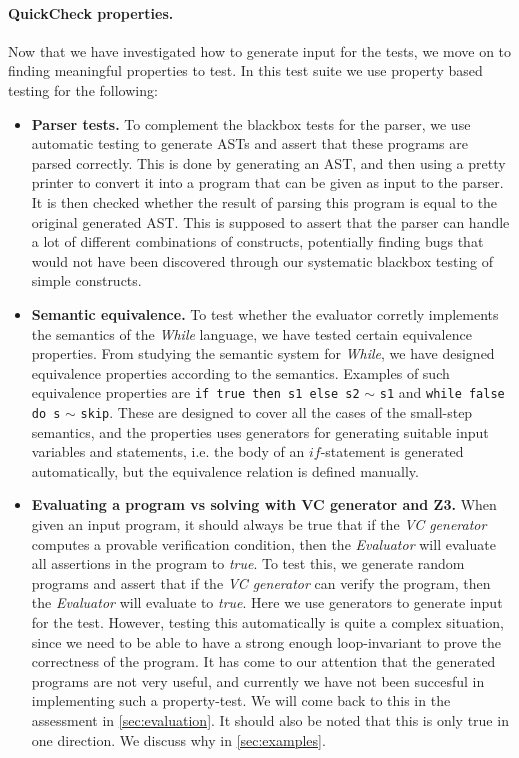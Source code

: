 \paragraph{QuickCheck properties.}
Now that we have investigated how to generate input for the tests, we move on to finding meaningful properties to test. In this test suite we use property based testing for the following:
\begin{itemize}
	\item \textbf{Parser tests.}
	To complement the blackbox tests for the parser, we use automatic testing to generate ASTs and assert that these programs are parsed correctly. This is done by generating an AST, and then using a pretty printer to convert it into a program that can be given as input to the parser. It is then checked whether the result of parsing this program is equal to the original generated AST. This is supposed to assert that the parser can handle a lot of different combinations of constructs, potentially finding bugs that would not have been discovered through our systematic blackbox testing of simple constructs.
	\item \textbf{Semantic equivalence.}
  To test whether the evaluator corretly implements the semantics of the \textit{While} language, we have tested certain equivalence properties. From studying the semantic system for \textit{While}, we have designed equivalence properties according to the semantics. 
	Examples of such equivalence properties are \texttt{if true then s1 else s2} $\sim$ \texttt{s1} and \texttt{while false do s} $\sim$ \texttt{skip}.
  These are designed to cover all the cases of the small-step semantics, and the properties uses generators for generating suitable input variables and statements, i.e. the body of an $if$-statement is generated automatically, but the equivalence relation is defined manually.
	\item \textbf{Evaluating a program vs solving with VC generator and Z3.}
	When given an input program, it should always be true that if the \textit{VC generator} computes a provable verification condition, then the \textit{Evaluator} will evaluate all assertions in the program to \textit{true}.
	To test this, we generate random programs and assert that if the \textit{VC generator} can verify the program, then the \textit{Evaluator} will evaluate to \textit{true}. 
	Here we use generators to generate input for the test. 
	However, testing this automatically is quite a complex situation, since we need to be able to have a strong enough loop-invariant to prove the correctness of the program. 
	It has come to our attention that the generated programs are not very useful, and currently we have not been succesful in implementing such a property-test. We will come back to this in the assessment in \autoref{sec:evaluation}.
	It should also be noted that this is only true in one direction. We discuss why in \autoref{sec:examples}.
\end{itemize}

